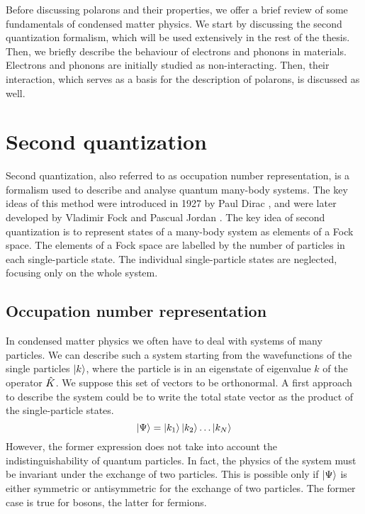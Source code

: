 Before discussing polarons and their properties, we offer a brief review of some fundamentals of condensed matter physics. We start by discussing the second quantization formalism, which will be used extensively in the rest of the thesis. Then, we briefly describe the behaviour of electrons and phonons in materials. Electrons and phonons are initially studied as non-interacting. Then, their interaction, which serves as a basis for the description of polarons, is discussed as well.

\section{Second quantization} \label{sec:second_quantization}
Second quantization, also referred to as occupation number representation, is a formalism used to describe and analyse quantum many-body systems. The key ideas of this method were introduced in 1927 by Paul Dirac \cite{dirac1927}, and were later developed by Vladimir Fock and Pascual Jordan \cite{fock1932}. The key idea of second quantization is to represent states of a many-body system as elements of a Fock space. The elements of a Fock space are labelled by the number of particles in each single-particle state. The individual single-particle states are neglected, focusing only on the whole system.

\subsection{Occupation number representation}
In condensed matter physics we often have to deal with systems of many particles. We can describe such a system starting from the wavefunctions of the single particles $\ket{k}$, where the particle is in an eigenstate of eigenvalue $k$ of the operator $\hat{K}$. We suppose this set of vectors to be orthonormal. A first approach to describe the system could be to write the total state vector as the product of the single-particle states.
\begin{equation} \label{eq:simple_basis}
    \ket{\Psi} = \ket{k_1}\ket{k_2}\dots\ket{k_N}
\end{equation}
However, the former expression does not take into account the indistinguishability of quantum particles. In fact, the physics of the system must be invariant under the exchange of two particles. This is possible only if $\ket{\Psi}$ is either symmetric or antisymmetric for the exchange of two particles. The former case is true for bosons, the latter for fermions. %

